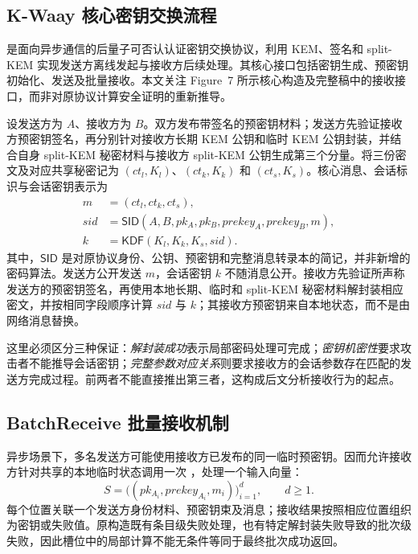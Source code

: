 \subsection{K-Waay 核心密钥交换流程}
\label{subsec:core-protocol}

\kwaay 是面向异步通信的后量子可否认认证密钥交换协议，利用 KEM、签名和 split-KEM 实现发送方离线发起与接收方后续处理\cite{collins2024kwaay}。其核心接口包括密钥生成、预密钥初始化、发送及批量接收。本文关注 Figure~7 所示核心构造及完整稿中的接收接口，而非对原协议计算安全证明的重新推导\cite{collins2024kwaayfull}。

设发送方为 $A$、接收方为 $B$。双方发布带签名的预密钥材料；发送方先验证接收方预密钥签名，再分别针对接收方长期 KEM 公钥和临时 KEM 公钥封装，并结合自身 split-KEM 秘密材料与接收方 split-KEM 公钥生成第三个分量。将三份密文及对应共享秘密记为 $(ct_l,K_l)$、$(ct_k,K_k)$ 和 $(ct_s,K_s)$。核心消息、会话标识与会话密钥表示为
\begin{equation}
\begin{aligned}
  m&=(ct_l,ct_k,ct_s),\\
  sid&=\mathsf{SID}(A,B,pk_A,pk_B,prekey_A,prekey_B,m),\\
  k&=\mathsf{KDF}(K_l,K_k,K_s,sid).
\end{aligned}
\label{eq:core-transcript}
\end{equation}
其中，$\mathsf{SID}$ 是对原协议身份、公钥、预密钥和完整消息转录本的简记，并非新增的密码算法。发送方公开发送 $m$，会话密钥 $k$ 不随消息公开。接收方先验证所声称发送方的预密钥签名，再使用本地长期、临时和 split-KEM 秘密材料解封装相应密文，并按相同字段顺序计算 $sid$ 与 $k$；其接收方预密钥来自本地状态，而不是由网络消息替换。

这里必须区分三种保证：\emph{解封装成功}表示局部密码处理可完成；\emph{密钥机密性}要求攻击者不能推导会话密钥；\emph{完整参数对应关系}则要求接收方的会话参数存在匹配的发送方完成过程。前两者不能直接推出第三者，这构成后文分析接收行为的起点。

\subsection{BatchReceive 批量接收机制}
\label{subsec:batch-interface}

异步场景下，多名发送方可能使用接收方已发布的同一临时预密钥。\kwaay 因而允许接收方针对共享的本地临时状态调用一次 \batchreceive，处理一个输入向量\cite{collins2024kwaayfull}：
\begin{equation}
 S=\bigl((pk_{A_i},prekey_{A_i},m_i)\bigr)_{i=1}^{d},\qquad d\geq 1.
 \label{eq:batch-vector}
\end{equation}
每个位置关联一个发送方身份材料、预密钥束及消息；接收结果按照相应位置组织为密钥或失败值。原构造既有条目级失败处理，也有特定解封装失败导致的批次级失败，因此槽位中的局部计算不能无条件等同于最终批次成功返回。

